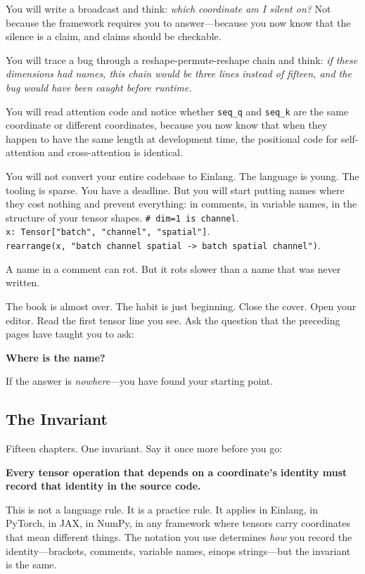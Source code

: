 \documentclass[11pt,titlepage]{article}
\begin{document}
You will write a broadcast and think: \emph{which coordinate am I silent
on?} Not because the framework requires you to answer---because you now
know that the silence is a claim, and claims should be checkable.

You will trace a bug through a reshape-permute-reshape chain and think:
\emph{if these dimensions had names, this chain would be three lines
instead of fifteen, and the bug would have been caught before runtime.}

You will read attention code and notice whether \texttt{seq\_q} and
\texttt{seq\_k} are the same coordinate or different coordinates,
because you now know that when they happen to have the same length at
development time, the positional code for self-attention and
cross-attention is identical.

You will not convert your entire codebase to Einlang. The language is
young. The tooling is sparse. You have a deadline. But you will start
putting names where they cost nothing and prevent everything: in
comments, in variable names, in the structure of your tensor shapes.
\texttt{\#\ dim=1\ is\ channel}.
\texttt{x:\ Tensor{[}"batch",\ "channel",\ "spatial"{]}}.
\texttt{rearrange(x,\ "batch\ channel\ spatial\ -\textgreater{}\ batch\ spatial\ channel")}.

A name in a comment can rot. But it rots slower than a name that was
never written.

The book is almost over. The habit is just beginning. Close the cover.
Open your editor. Read the first tensor line you see. Ask the question
that the preceding pages have taught you to ask:

\textbf{Where is the name?}

If the answer is \emph{nowhere}---you have found your starting point.

\vspace{2em}

\hypertarget{the-invariant}{%
\subsection{The Invariant}\label{the-invariant}}

Fifteen chapters. One invariant. Say it once more before you go:

\textbf{Every tensor operation that depends on a coordinate's identity
must record that identity in the source code.}

This is not a language rule. It is a practice rule. It applies in
Einlang, in PyTorch, in JAX, in NumPy, in any framework where tensors
carry coordinates that mean different things. The notation you use
determines \emph{how} you record the identity---brackets, comments,
variable names, einops strings---but the invariant is the same.
\end{document}
